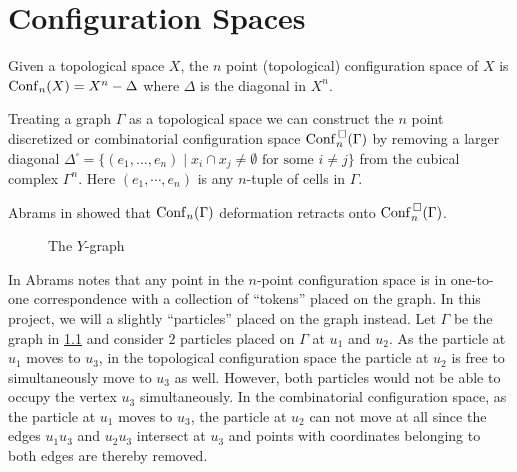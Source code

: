 \chapter{Configuration Spaces}
Given a topological space \(X\), the \(n\) point (topological) configuration space of \(X\) is
\(\mathrm{Conf}_n(X) = X^n - \Delta\) where \(\Delta\) is the diagonal in \(X^n\).

Treating a graph \(\Gamma\) as a topological space we can construct the
\(n\) point discretized or combinatorial configuration space \(\mathrm{Conf}^{\,\square}_n(\Gamma)\) by 
removing a larger diagonal \(\Delta^{\square} = \{(e_1, \ldots, e_n) \mid x_i \cap x_j \neq \emptyset \text{ for some } i \neq j\}\)
from the cubical complex \(\Gamma^n\). Here \((e_1, \cdots, e_n)\) is any \(n\)-tuple of cells in \(\Gamma\).

Abrams in \cite{abrams2000configurationspaces} showed that \(\mathrm{Conf}_n(\Gamma)\) deformation retracts onto \(\mathrm{Conf}^{\,\square}_n(\Gamma)\).
\begin{figure}
\centering
{}
\caption{The \(Y\)-graph}
\label{fig:ygraph}
\end{figure}
In \cite{abrams2000configurationspaces} Abrams notes that any point in the
\(n\)-point configuration space is in one-to-one correspondence with a
collection of ``tokens'' placed on the graph. In this project, we will a
slightly ``particles'' placed on the graph instead.  Let \(\Gamma\) be the graph
in \ref{fig:ygraph} and consider \(2\) particles placed on \(\Gamma\) at \(u_1\)
and \(u_2\).  As the particle at \(u_1\) moves to \(u_3\), in the topological
configuration space the particle at \(u_2\) is free to simultaneously move to
\(u_3\) as well. However, both particles would not be able to occupy the vertex
\(u_3\) simultaneously.  In the combinatorial configuration space, as the
particle at \(u_1\) moves to \(u_3\), the particle at \(u_2\) can not move at
all since the edges \(u_1 u_3\) and \(u_2 u_3\) intersect at \(u_3\) and points
with coordinates belonging to both edges are thereby removed.

